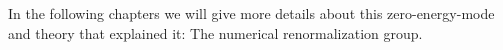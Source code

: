  In the following chapters we will give more details about this zero-energy-mode and theory that  explained it: The numerical renormalization group.  




















